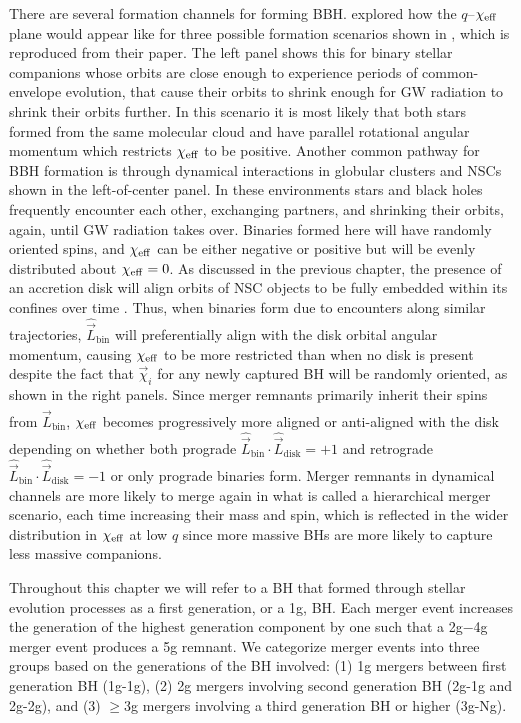 There are several formation channels for forming BBH.
\citet{Santini+23} explored how the $q$--$\chi_{\rm eff}$ plane would appear like for three possible formation scenarios shown in , which is reproduced from their paper.
The left panel shows this for binary stellar companions whose orbits are close enough to experience periods of common-envelope evolution, that cause their orbits to shrink enough for GW radiation to shrink their orbits further.
In this scenario it is most likely that both stars formed from the same molecular cloud and have parallel rotational angular momentum which restricts $\chi_{\rm eff}$ to be positive.
Another common pathway for BBH formation is through dynamical interactions in globular clusters and NSCs shown in the left-of-center panel.
In these environments stars and black holes frequently encounter each other, exchanging partners, and shrinking their orbits, again, until GW radiation takes over.
Binaries formed here will have randomly oriented spins, and $\chi_{\rm eff}$ can be either negative or positive but will be evenly distributed about $\chi_{\rm eff}=0$.
As discussed in the previous chapter, the presence of an accretion disk will align orbits of NSC objects to be fully embedded within its confines over time \citep{Fabj+20,Nasim+22}.
Thus, when binaries form due to encounters along similar trajectories, $\hat{\vec{L}}_\text{bin}$ will preferentially align with the disk orbital angular momentum, causing $\chi_{\rm eff}$ to be more restricted than when no disk is present despite the fact that $\vec{\chi}_i$ for any newly captured BH will be randomly oriented, as shown in the right panels.
Since merger remnants primarily inherit their spins from $\hat{\vec{L}}_\text{bin}$, $\chi_{\rm eff}$ becomes progressively more aligned or anti-aligned with the disk depending on whether both prograde $\hat{\vec{L}}_\text{bin} \cdot \hat{\vec{L}}_\text{disk} = +1$ and retrograde $\hat{\vec{L}}_\text{bin} \cdot \hat{\vec{L}}_\text{disk} = -1$ or only prograde binaries form.
Merger remnants in dynamical channels are more likely to merge again in what is called a hierarchical merger scenario, each time increasing their mass and spin, which is reflected in the wider distribution in $\chi_{\rm eff}$ at low $q$ since more massive BHs are more likely to capture less massive companions.


Throughout this chapter we will refer to a BH that formed through stellar evolution processes as a first generation, or a 1g, BH.
Each merger event increases the generation of the highest generation component by one such that a 2g$-$4g merger event produces a 5g remnant.
We categorize merger events into three groups based on the generations of the BH involved: (1) 1g mergers between first generation BH (1g-1g), (2) 2g mergers involving second generation BH (2g-1g and 2g-2g), and (3) $\geq$3g mergers involving a third generation BH or higher (3g-Ng).

